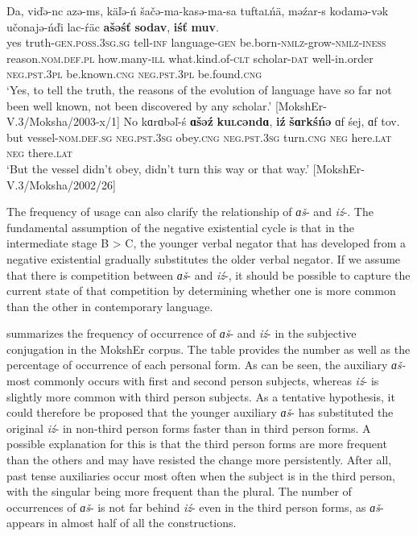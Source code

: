 \documentclass[output=paper,colorlinks,citecolor=brown,draft,draftmode]{langscibook}
\begin{document}
\ea\label{ex:moksha-evolution}
\gll Da, viďə-nc azə-ms, käľə-ń šačə-ma-kasə-ma-sa tufta\textsc{l}ńä, məźar-s kodamə-vək učonajə-ńďi lac-ŕäc \textbf{ašəśť} \textbf{sodav}, \textbf{iśť} \textbf{muv}.\\
yes truth-\textsc{gen.poss.3sg.sg} tell-\textsc{inf} language-\textsc{gen} be.born-\textsc{nmlz}-grow-\textsc{nmlz-iness} reason.\textsc{nom.def.pl}  how.many-\textsc{ill}    what.kind.of-\textsc{clt} scholar-\textsc{dat} well-in.order \textsc{neg.pst.3pl} be.known.\textsc{cng} \textsc{neg.pst.3pl} be.found.\textsc{cng}\\
\glt `Yes, to tell the truth, the reasons of the evolution of language have so far not been well known, not been discovered by any scholar.' [MokshEr-V.3/Moksha/2003-x/1]
\z
\ea\label{ex:moksha-vessel}
\gll No kɑrɑbəľ-ś \textbf{ɑšəź} \textbf{ku\textsc{l}cəndɑ}, \textbf{iź} \textbf{šɑrkśńə} ɑf śej, ɑf tov.\\
but vessel-\textsc{nom.def.sg} \textsc{neg.pst.3sg} obey.\textsc{cng} 
\textsc{neg.pst.3sg} turn.\textsc{cng} \textsc{neg} here.\textsc{lat} \textsc{neg}    there.\textsc{lat}\\
\glt `But the vessel didn't obey, didn't turn this way or that way.' [MokshEr-V.3/Moksha/2002/26]
\z

  The frequency of usage can also clarify the relationship of \textit{ɑš}- and \textit{iź}-. The fundamental assumption of the negative existential cycle is that in the intermediate stage B > C, the younger verbal negator that has developed from a negative existential gradually substitutes the older verbal negator. If we assume that there is competition between \textit{ɑš}- and \textit{iź}-, it should be possible to capture the current state of that competition by determining whether one is more common than the other in contemporary language. 

\newpage
{} summarizes the frequency of occurrence of \textit{ɑš}- and \textit{iź}- in the subjective conjugation in the MokshEr corpus. The table provides the number as well as the percentage of occurrence of each personal form. As can be seen, the auxiliary \textit{ɑš-} most commonly occurs with first and second person subjects, whereas \textit{iź}- is slightly more common with third person subjects. As a tentative hypothesis, it could therefore be proposed that the younger auxiliary \textit{ɑš}- has substituted the original \textit{iź}- in non-third person forms faster than in third person forms. A possible explanation for this is that the third person forms are more frequent than the others and may have resisted the change more persistently. After all, past tense auxiliaries occur most often when the subject is in the third person, with the singular being more frequent than the plural. The number of occurrences of \textit{ɑš}- is not far behind \textit{iź}- even in the third person forms, as \textit{ɑš}- appears in almost half of all the constructions.
\end{document}

